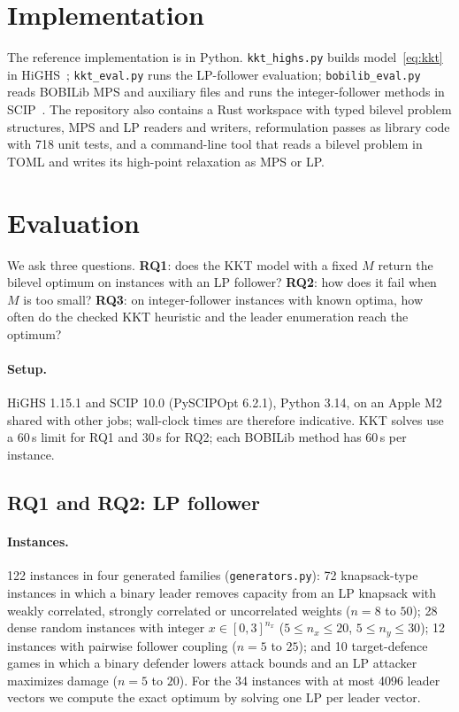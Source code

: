 \documentclass[11pt]{article}
\begin{document}
\section{Implementation}
\label{sec:impl}

The reference implementation is in Python. \texttt{kkt\_highs.py} builds
model~\eqref{eq:kkt} in HiGHS~\cite{huangfu2018highs};
\texttt{kkt\_eval.py} runs the LP-follower evaluation;
\texttt{bobilib\_eval.py} reads BOBILib MPS and auxiliary files and runs the
integer-follower methods in SCIP~\cite{bolusani2024scip}. The repository also
contains a Rust workspace with typed bilevel problem structures, MPS and LP
readers and writers, reformulation passes as library code with 718 unit
tests, and a command-line tool that reads a bilevel problem in TOML and
writes its high-point relaxation as MPS or LP.

\section{Evaluation}
\label{sec:eval}

We ask three questions.
\textbf{RQ1}: does the KKT model with a fixed $M$ return the bilevel optimum
on instances with an LP follower?
\textbf{RQ2}: how does it fail when $M$ is too small?
\textbf{RQ3}: on integer-follower instances with known optima, how often do
the checked KKT heuristic and the leader enumeration reach the optimum?

\paragraph{Setup.} HiGHS 1.15.1 and SCIP 10.0 (PySCIPOpt 6.2.1), Python 3.14,
on an Apple M2 shared with other jobs; wall-clock times are therefore
indicative. KKT solves use a 60\,s limit for RQ1 and 30\,s for RQ2; each
BOBILib method has 60\,s per instance.

\subsection{RQ1 and RQ2: LP follower}
\label{sec:eval-lp}

\paragraph{Instances.} 122 instances in four generated families
(\texttt{generators.py}): 72 knapsack-type instances in which a binary leader
removes capacity from an LP knapsack with weakly correlated, strongly
correlated or uncorrelated weights ($n = 8$ to $50$); 28 dense random
instances with integer $x \in [0,3]^{n_x}$ ($5 \le n_x \le 20$,
$5 \le n_y \le 30$); 12 instances with pairwise follower coupling
($n = 5$ to $25$); and 10 target-defence games in which a binary defender
lowers attack bounds and an LP attacker maximizes damage ($n = 5$ to $20$).
For the 34 instances with at most 4096 leader vectors we compute the exact
optimum by solving one LP per leader vector.
\end{document}
